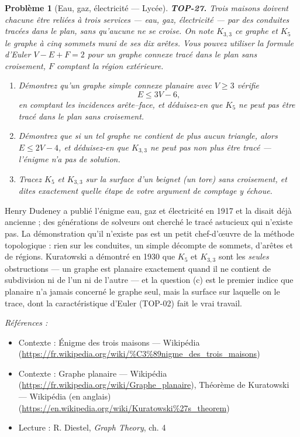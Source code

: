 \documentclass[11pt]{article}
\newtheorem{problem}{Problème}
\newenvironment{refs}{\par\small\noindent\emph{Références :}\begin{itemize}\setlength\itemsep{0pt}}{\end{itemize}\normalsize}
\begin{document}
\begin{problem}[{Eau, gaz, électricité --- Lycée}]
\textbf{TOP-27.} Trois maisons doivent chacune être reliées à trois services --- eau, gaz,
électricité --- par des conduites tracées dans le plan, sans qu'aucune ne se croise. On note
$ K_{3,3} $ ce graphe et $ K_5 $ le graphe à cinq sommets muni de ses dix arêtes. Vous pouvez
utiliser la formule d'Euler $ V - E + F = 2 $ pour un graphe connexe tracé dans le plan sans
croisement, $ F $ comptant la région extérieure.
\begin{enumerate}
\item[(a)] Démontrez qu'un graphe simple connexe planaire avec $ V \ge 3 $ vérifie
\[ E \le 3V - 6 , \]
en comptant les incidences arête--face, et déduisez-en que $ K_5 $ ne peut pas être tracé dans le
plan sans croisement.
\item[(b)] Démontrez que si un tel graphe ne contient de plus aucun triangle, alors $ E \le 2V - 4 $, et
déduisez-en que $ K_{3,3} $ ne peut pas non plus être tracé --- l'énigme n'a pas de solution.
\item[(c)] Tracez $ K_5 $ et $ K_{3,3} $ sur la surface d'un beignet (un tore) sans croisement, et dites
exactement quelle étape de votre argument de comptage y échoue.
\end{enumerate}

\end{problem}

\noindent Henry Dudeney a publié l'énigme \og{} eau, gaz et électricité \fg{} en 1917 et la disait déjà
ancienne ; des générations de solveurs ont cherché le tracé astucieux qui n'existe pas. La démonstration
qu'il n'existe pas est un petit chef-d'\oe{}uvre de la méthode topologique : rien sur les conduites, un
simple décompte de sommets, d'arêtes et de régions. Kuratowski a démontré en 1930 que $ K_5 $ et
$ K_{3,3} $ sont les \textit{seules} obstructions --- un graphe est planaire exactement quand il ne
contient de subdivision ni de l'un ni de l'autre --- et la question (c) est le premier indice que
\og{} planaire \fg{} n'a jamais concerné le graphe seul, mais la surface sur laquelle on le trace, dont la
caractéristique d'Euler (TOP-02) fait le vrai travail.

\begin{refs}
\item Contexte : Énigme des trois maisons --- Wikipédia (\url{https://fr.wikipedia.org/wiki/%C3%89nigme_des_trois_maisons})
\item Contexte : Graphe planaire --- Wikipédia (\url{https://fr.wikipedia.org/wiki/Graphe_planaire}), Théorème de Kuratowski --- Wikipédia (en anglais) (\url{https://en.wikipedia.org/wiki/Kuratowski%27s_theorem})
\item Lecture : R. Diestel, \textit{Graph Theory}, ch. 4
\end{refs}
\end{document}
